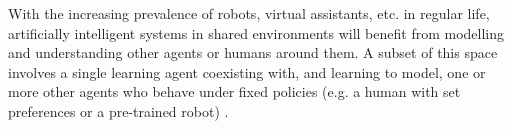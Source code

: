 With the increasing prevalence of robots, virtual assistants, etc. in regular life, artificially intelligent systems in shared environments will benefit from modelling and understanding other agents or humans around them. %
A subset of this space involves a single learning agent coexisting with, and learning to model, one or more other agents who behave under fixed policies (e.g. a human with set preferences or a pre-trained robot) \cite{AIJ18-Albrecht}. 


